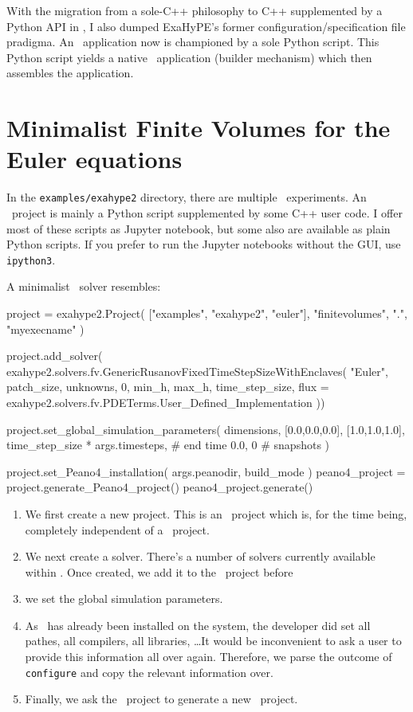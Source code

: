 With the migration from a sole-C++ philosophy to C++ supplemented by a Python
API in \Peano, I also dumped ExaHyPE's former configuration/specification file
pradigma.
An \ExaHyPE\ application now is championed by a sole Python script.
This Python script yields a native \Peano\ application (builder mechanism) which
then assembles the application.



\section{Minimalist Finite Volumes for the Euler equations}
\label{section:exahype:fv}


\begin{remark}
 In the \texttt{examples/exahype2} directory, there are multiple \ExaHyPE\
 experiments. An \ExaHyPE\ project is mainly a Python script supplemented by
 some C++ user code. I offer most of these scripts as Jupyter notebook, but some
 also are available as plain Python scripts. If you prefer to run the Jupyter
 notebooks without the GUI, use \texttt{ipython3}.
\end{remark}


\noindent
A minimalist \ExaHyPE\ solver resembles:
\begin{code}
project = exahype2.Project( ["examples", "exahype2", "euler"], "finitevolumes", ".", "myexecname" )

project.add_solver(  exahype2.solvers.fv.GenericRusanovFixedTimeStepSizeWithEnclaves(
  "Euler",
  patch_size,
  unknowns, 0,
  min_h, max_h,
  time_step_size,
  flux = exahype2.solvers.fv.PDETerms.User_Defined_Implementation
))

project.set_global_simulation_parameters(
  dimensions, [0.0,0.0,0.0], [1.0,1.0,1.0],
  time_step_size * args.timesteps, # end time
  0.0, 0                           # snapshots
)

project.set_Peano4_installation( args.peanodir, build_mode )
peano4_project = project.generate_Peano4_project()
peano4_project.generate()
\end{code}

\begin{enumerate}
  \item We first create a new project. This is an \ExaHyPE\ project which is,
  for the time being, completely independent of a \Peano\ project.
  \item We next create a solver. 
  There's a number of solvers currently available within \ExaHyPE.
  Once created, we add it to the \ExaHyPE\ project before 
  \item we set the global simulation parameters.
  \item As \Peano\ has already been installed on the system, the developer did
  set all pathes, all compilers, all libraries, \ldots It would be inconvenient
  to ask a user to provide this information all over again. Therefore, we parse
  the outcome of \texttt{configure} and copy the relevant information over.
  \item Finally, we ask the \ExaHyPE\ project to generate a new \Peano\ project. 
\end{enumerate}


